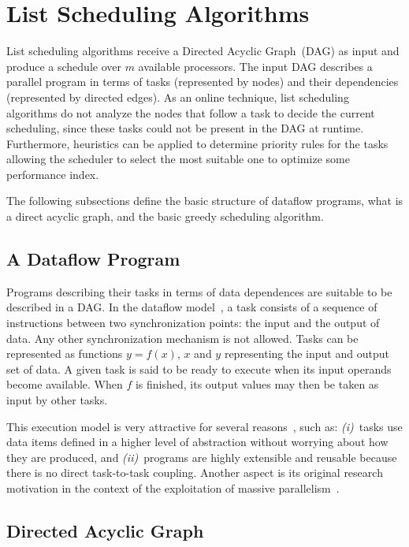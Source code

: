 \documentclass[twocolumn]{svjour3}
\begin{document}
\section{List Scheduling Algorithms} \label{sec:listscheduling}

List scheduling algorithms receive a Directed Acyclic Graph~(DAG) as input and produce a schedule over $m$ available processors. The input DAG describes a parallel program in terms of tasks (represented by nodes) and their dependencies (represented by directed edges). As an online technique, list scheduling algorithms do not analyze the nodes that follow a task to decide the current scheduling, since these tasks could not be present in the DAG at runtime. Furthermore, heuristics can be applied to determine priority rules for the tasks allowing the scheduler to select the most suitable one to optimize some performance index.

The following subsections define the basic structure of dataflow programs, what is a direct acyclic graph, and the basic greedy scheduling algorithm. 

\subsection{A Dataflow Program}

Programs describing their tasks in terms of data dependences are suitable to be described in a DAG. In the dataflow model~\cite{dataflowAdvances2004}, a task consists of a sequence of instructions between two synchronization points: the input and the output of data. Any other synchronization mechanism is not allowed. Tasks can be represented as functions $y= f(x)$, $x$ and $y$ representing the input and output set of data. A given task is said to be ready to execute when its input operands become available. When $f$ is finished, its output values may then be taken as input by other tasks. 

This execution model is very attractive for several reasons~\cite{prasanna2005}, such as:  {\em (i)}~tasks use data items defined in a higher level of abstraction without worrying about how they are produced, and {\em (ii)}~programs are highly extensible and reusable because there is no direct task-to-task coupling. Another aspect is its original research motivation in the context of the exploitation of massive parallelism~\cite{dataflowAdvances2004}.

\subsection{Directed Acyclic Graph}
\end{document}
